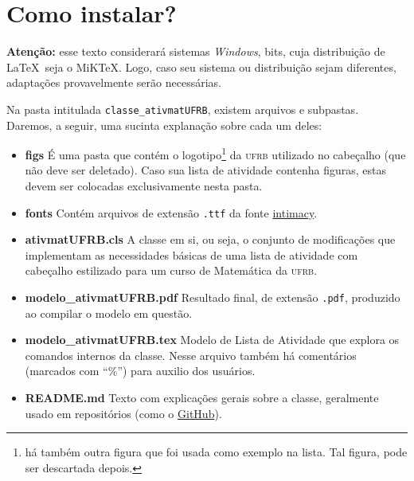 \section{Como instalar?}
%
\begin{citacao}
\textbf{Atenção:} esse texto considerará sistemas \textit{Windows}, 
\unit[64]{bits}, cuja distribuição de \LaTeX\ seja o MiK\TeX.
Logo, caso seu sistema ou distribuição sejam diferentes, adaptações 
provavelmente serão necessárias.
\end{citacao}
 
Na pasta intitulada \texttt{classe\_ativmatUFRB}, existem arquivos e subpastas.
Daremos, a seguir, uma sucinta explanação sobre cada um deles:

\begin{itemize}
  \item \textbf{figs} É uma pasta que contém o logotipo\footnote{há também 
   outra figura que foi usada como exemplo na lista.
   Tal figura, pode ser descartada depois.} da \textsc{ufrb} utilizado no 
   cabeçalho (que não deve ser deletado).
   Caso sua lista de atividade contenha figuras, estas devem ser colocadas 
   exclusivamente nesta pasta.
  \item \textbf{fonts} Contém arquivos de extensão \texttt{.ttf} da fonte
   \href{https://www.tug.org/FontCatalogue/intimacy/}{intimacy}.
  \item \textbf{ativmatUFRB.cls} A classe em si, ou seja, o conjunto de 
   modificações que implementam as necessidades básicas de uma lista de 
   atividade com cabeçalho estilizado para um curso de Matemática da \textsc{ufrb}. 
  \item \textbf{modelo\_ativmatUFRB.pdf} Resultado final, de extensão 
   \texttt{.pdf}, produzido ao compilar o modelo em questão.
  \item \textbf{modelo\_ativmatUFRB.tex} Modelo de Lista de Atividade que
   explora os comandos internos da classe. 
   Nesse arquivo também há comentários (marcados com ``\%'') para auxilio dos 
   usuários.
  \item \textbf{README.md} Texto com explicações gerais sobre a classe, 
   geralmente usado em repositórios (como o \href{https://github.com/}{GitHub}).
\end{itemize}

